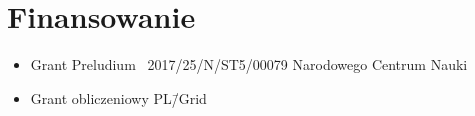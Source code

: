 \section{Finansowanie}\label{intro:founding}
\begin{fullwidth}
\begin{itemize}
  \item Grant Preludium \textnumero~2017/25/N/ST5/00079 Narodowego Centrum Nauki
  \item Grant obliczeniowy PL\=/Grid
\end{itemize}
\end{fullwidth}

\begin{fullwidth}
  \printglossary[title=Wykaz skrótów, type=\acronymtype]
\end{fullwidth}
  